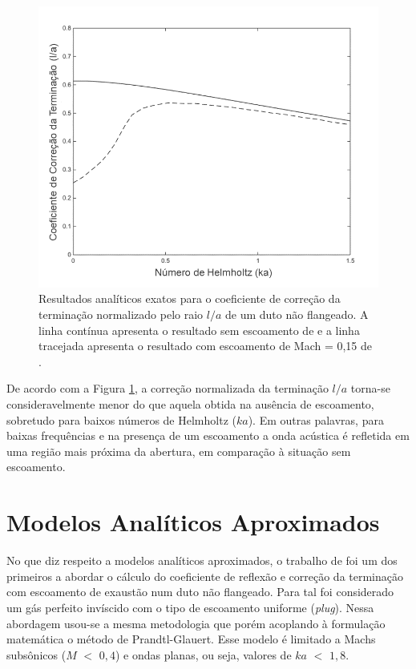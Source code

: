 \begin{figure}[ht!]
\centering
  \includegraphics[width=.9\linewidth]{figuras/loa_comparacao.png}
  \caption[Coeficientes de correção de terminação $l/a$]{Resultados analíticos exatos para o coeficiente de correção da terminação normalizado pelo raio $l/a$ de um duto não flangeado. A linha contínua apresenta o resultado sem escoamento de  e a linha tracejada apresenta o resultado com escoamento de Mach = 0,15 de .}
  \label{fig:comp2}
\end{figure}

De acordo com a Figura \ref{fig:comp2}, a correção normalizada da terminação $l/a$ torna-se consideravelmente menor do que aquela obtida na ausência de escoamento, sobretudo para baixos números de Helmholtz ($ka$). Em outras palavras, para baixas frequências e na presença de um escoamento a onda acústica é refletida em uma região mais próxima da abertura, em comparação à situação sem escoamento.

\section{Modelos Analíticos Aproximados}

No que diz respeito a modelos analíticos aproximados, o trabalho de  foi um dos primeiros a abordar o cálculo do coeficiente de reflexão e correção da terminação com escoamento de exaustão num duto não flangeado. Para tal foi considerado um gás perfeito invíscido com o tipo de escoamento uniforme (\textit{plug}). Nessa abordagem usou-se a mesma metodologia que  porém acoplando à formulação matemática o método de Prandtl-Glauert. Esse modelo é limitado a Machs subsônicos ($M$ $<$ $0,4$) e ondas planas, ou seja, valores de $ka$ $<$ $1,8$.

